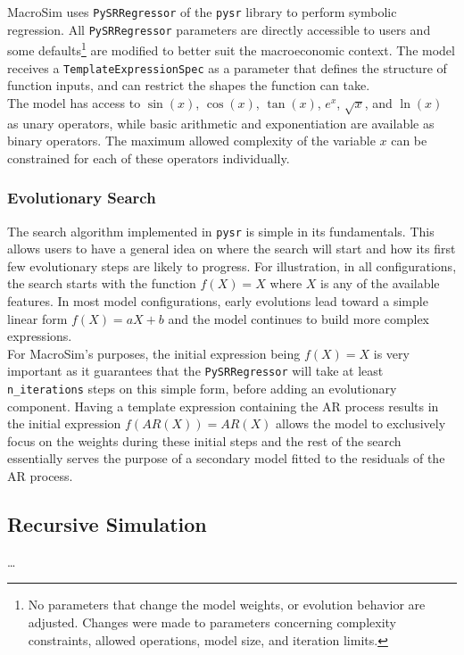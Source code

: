     MacroSim uses \texttt{PySRRegressor} of the \texttt{pysr} library to perform symbolic regression.
    All \texttt{PySRRegressor} parameters are directly accessible to users and some defaults\footnote[2]{No parameters that change the model weights, or evolution behavior are adjusted. Changes were made to parameters concerning complexity constraints, allowed operations, model size, and iteration limits.} are modified to better suit the macroeconomic context.
    The model receives a \texttt{TemplateExpressionSpec} as a parameter that defines the structure of function inputs, and can restrict the shapes the function can take.
    \\

    The model has access to $\sin(x)$, $\cos(x)$, $\tan(x)$, $e^x$, $\sqrt{x}$, and $\ln(x)$ as unary operators, while basic arithmetic and exponentiation are available as binary operators.
    The maximum allowed complexity of the variable $x$ can be constrained for each of these operators individually.

\subsubsection{Evolutionary Search}\label{subsubsec:evolutionary-search}
    The search algorithm implemented in \texttt{pysr} is simple in its fundamentals.
    This allows users to have a general idea on where the search will start and how its first few evolutionary steps are likely to progress.
    For illustration, in all configurations, the search starts with the function $f(X) = X$ where $X$ is any of the available features.
    In most model configurations, early evolutions lead toward a simple linear form $f(X) = aX + b$ and the model continues to build more complex expressions.
    \\

    For MacroSim's purposes, the initial expression being $f(X) = X$ is very important as it guarantees that the \texttt{PySRRegressor} will take at least \texttt{n\_iterations} steps on this simple form, before adding an evolutionary component.
    Having a template expression containing the AR process results in the initial expression $f(AR(X)) = AR(X)$ allows the model to exclusively focus on the weights during these initial steps and the rest of the search essentially serves the purpose of a secondary model fitted to the residuals of the AR process.

\subsection{Recursive Simulation}\label{subsec:recursive-simulation}
    \dots



